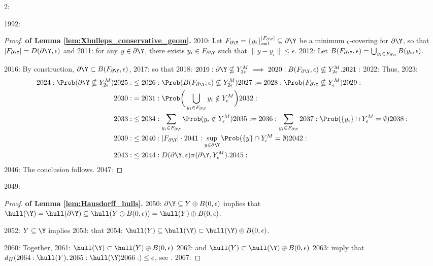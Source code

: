 2: \documentclass[12pt]{l4dc2022} %
\begin{document}
1992: \begin{proof}\textbf{of Lemma \ref{lem:Xhulleps_conservative_geom}.} 
2010: Let $F_{\partial\Y}=\{y_i\}_{i=1}^{|F_{\partial\Y}|}\subseteq\partial\Y$ be a minimum $\epsilon$-covering for $\partial\Y$, so that $|F_{\partial\Y}|=D(\partial\Y,\epsilon)$ and 
2011:  for any $y\in\partial\Y$, there exists $y_i\in F_{\partial\Y}$ such that $\|y-y_i\|\leq \epsilon$. 
2012:  Let $B(F_{\partial\Y},\epsilon)=\bigcup_{y_i\in F_{\partial\Y}} B(y_i,\epsilon)$. 

2016: By construction, $\partial\Y\subset B(F_{\partial\Y},\epsilon)$,
2017: so that 
2018: $
2019: \partial\Y\nsubseteq Y_{2\epsilon}^M\implies
2020: B(F_{\partial\Y},\epsilon)\nsubseteq Y_{2\epsilon}^M. 
2021: $
2022: Thus, 
2023: \begin{align*}
2024: \Prob(\partial\Y\nsubseteq Y_{2\epsilon}^M)
2025: &\leq 
2026: \Prob(B(F_{\partial\Y},\epsilon)\nsubseteq Y_{2\epsilon}^M)
2027: =
2028: \Prob(F_{\partial\Y}\nsubseteq Y_\epsilon^M)
2029: \\
2030: &=
2031: \Prob\bigg(\bigcup_{y_i\in F_{\partial\Y}} y_i\notin Y_\epsilon^M\bigg)
2032: \\
2033: &\leq 
2034: \sum_{y_i\in F_{\partial\Y}}\Prob(y_i\notin Y_\epsilon^M)
2035: =
2036: \sum_{y_i\in F_{\partial\Y}}
2037: \Prob(\{y_i\}\cap Y_\epsilon^M = \emptyset)
2038: \\
2039: &\leq 
2040: |F_{\partial\Y}| \cdot
2041: \sup_{y\in\partial\Y}\Prob(\{y\}\cap Y_{\epsilon}^M = \emptyset)
2042: \\
2043: &\leq 
2044: D(\partial\Y,\epsilon)\pi(\partial\Y,Y_{\epsilon}^M).
2045: \end{align*}
2046: The conclusion follows.
2047: \end{proof}

2049: \begin{proof}\textbf{of Lemma \ref{lem:Hausdorff_hulls}.} 
2050: $\partial\Y\subseteq Y\oplus B(0,\epsilon)$ implies that $\hull(\Y)=\hull(\partial\Y)\subseteq \hull(Y\oplus B(0,\epsilon))=\hull(Y)\oplus B(0,\epsilon)$.

2052: $Y\subseteq \Y$ implies %
2053: that 
2054: $\hull(Y)\subseteq \hull(\Y)\subset\hull(\Y)\oplus B(0,\epsilon)$.%

2060: Together, 
2061: $\hull(\Y)\subset\hull(Y)\oplus B(0,\epsilon)$
2062: and $\hull(Y)\subset\hull(\Y)\oplus B(0,\epsilon)$
2063: imply that $d_H(
2064: \hull(Y), 
2065: \hull(\Y)
2066: )\leq \epsilon$, see \citep{Schneider2014}.
2067: \end{proof}
\end{document}
